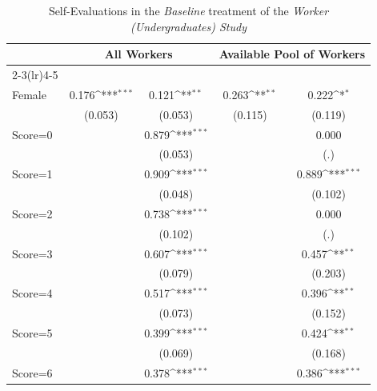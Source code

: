 \begin{table}[htbp]\centering
\def\sym#1{\ifmmode^{#1}\else\(^{#1}\)\fi}
\caption{Self-Evaluations in the \textit{Baseline} treatment of the \textit{Worker (Undergraduates) Study}}
\begin{tabular}{l*{4}{c}}
\hline\hline
                &\multicolumn{2}{c}{All Workers}      &\multicolumn{2}{c}{Available Pool of Workers}\\\cmidrule(lr){2-3}\cmidrule(lr){4-5}
                &\multicolumn{1}{c}{}&\multicolumn{1}{c}{}&\multicolumn{1}{c}{}&\multicolumn{1}{c}{}\\
\hline
Female          &    0.176\sym{***}&    0.121\sym{**} &    0.263\sym{**} &    0.222\sym{*}  \\
                &  (0.053)         &  (0.053)         &  (0.115)         &  (0.119)         \\
Score=0         &                  &    0.879\sym{***}&                  &    0.000         \\
                &                  &  (0.053)         &                  &      (.)         \\
Score=1         &                  &    0.909\sym{***}&                  &    0.889\sym{***}\\
                &                  &  (0.048)         &                  &  (0.102)         \\
Score=2         &                  &    0.738\sym{***}&                  &    0.000         \\
                &                  &  (0.102)         &                  &      (.)         \\
Score=3         &                  &    0.607\sym{***}&                  &    0.457\sym{**} \\
                &                  &  (0.079)         &                  &  (0.203)         \\
Score=4         &                  &    0.517\sym{***}&                  &    0.396\sym{**} \\
                &                  &  (0.073)         &                  &  (0.152)         \\
Score=5         &                  &    0.399\sym{***}&                  &    0.424\sym{**} \\
                &                  &  (0.069)         &                  &  (0.168)         \\
Score=6         &                  &    0.378\sym{***}&                  &    0.386\sym{***}\\

\end{tabular}
\end{table}
